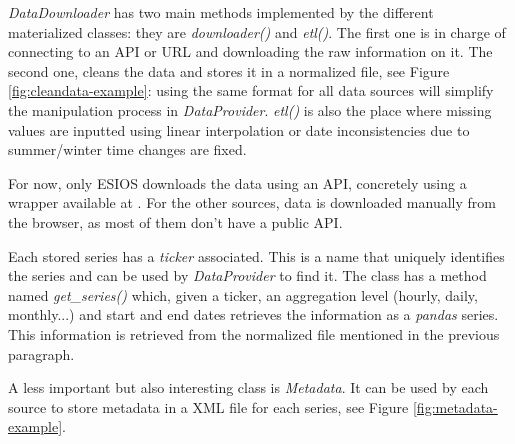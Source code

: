 \textit{DataDownloader} has two main methods implemented by the different materialized classes: they are \textit{downloader()} and \textit{etl()}. The first one is in charge of connecting to an API or URL and downloading the raw information on it. The second one, cleans the data and stores it in a normalized file, see Figure \ref{fig:cleandata-example}: using the same format for all data sources will simplify the manipulation process in \textit{DataProvider}. \textit{etl()} is also the place where missing values are inputted using linear interpolation or date inconsistencies due to summer/winter time changes are fixed.

For now, only ESIOS downloads the data using an API, concretely using a wrapper available at \cite{esios-api-wrapper}. For the other sources, data is downloaded manually from the browser, as most of them don't have a public API.

Each stored series has a \textit{ticker} associated. This is a name that uniquely identifies the series and can be used by \textit{DataProvider} to find it. The class has a method named \textit{get\_series()} which, given a ticker, an aggregation level (hourly, daily, monthly...) and start and end dates retrieves the information as a \textit{pandas} series. This information is retrieved from the normalized file mentioned in the previous paragraph.

A less important but also interesting class is \textit{Metadata}. It can be used by each source to store metadata in a XML file for each series, see Figure \ref{fig:metadata-example}.

